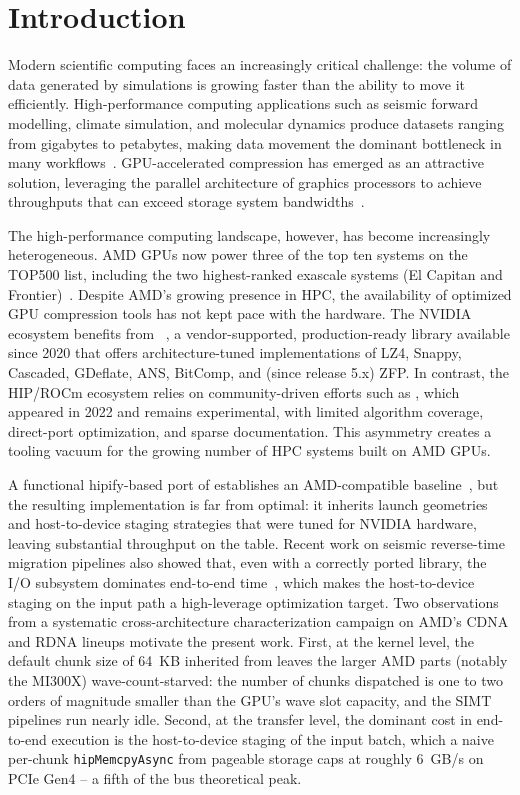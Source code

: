 \section{Introduction}
\label{sec:introduction}

Modern scientific computing faces an increasingly critical
challenge: the volume of data generated by simulations is growing
faster than the ability to move it efficiently. High-performance
computing applications such as seismic forward modelling, climate
simulation, and molecular dynamics produce datasets ranging from
gigabytes to petabytes, making data movement the dominant
bottleneck in many workflows~\cite{jin2024concealing,lee2002migration}.
GPU-accelerated compression has emerged as an attractive solution,
leveraging the parallel architecture of graphics processors to
achieve throughputs that can exceed storage system
bandwidths~\cite{nvcomp,knorr2021ndzip}.

The high-performance computing landscape, however, has become
increasingly heterogeneous. AMD GPUs now power three of the top ten
systems on the TOP500 list, including the two highest-ranked
exascale systems (El Capitan and Frontier)~\cite{top500nov2025}.
Despite AMD's growing presence in HPC, the availability of optimized
GPU compression tools has not kept pace with the hardware. The
NVIDIA ecosystem benefits from \nvcomp~\cite{nvcomp}, a
vendor-supported, production-ready library available since 2020
that offers architecture-tuned implementations of LZ4, Snappy,
Cascaded, GDeflate, ANS, BitComp, and (since release 5.x) ZFP. In
contrast, the HIP/ROCm ecosystem relies on community-driven efforts
such as \hipcomp{}, which appeared in 2022 and remains experimental,
with limited algorithm coverage, direct-port optimization, and
sparse documentation. This asymmetry creates a tooling vacuum for
the growing number of HPC systems built on AMD GPUs.

A functional hipify-based port of \nvcomp{} establishes an
AMD-compatible baseline~\cite{anon_iccsa2026,kunas2025compressao},
but the resulting implementation is far from optimal: it inherits
launch geometries and host-to-device staging strategies that were
tuned for NVIDIA hardware, leaving substantial throughput on the
table. Recent work on seismic reverse-time migration pipelines
also showed that, even with a correctly ported library, the I/O
subsystem dominates end-to-end time~\cite{kunas2024carla,
boito2017seismic}, which makes the host-to-device staging on the
input path a high-leverage optimization target. Two observations
from a systematic cross-architecture characterization campaign on
AMD's CDNA and RDNA lineups motivate the present work. First, at the kernel level, the default chunk size of 64~KB
inherited from \nvcomp{} leaves the larger AMD parts (notably the
MI300X) wave-count-starved: the number of chunks dispatched is one
to two orders of magnitude smaller than the GPU's wave slot
capacity, and the SIMT pipelines run nearly idle. Second, at the
transfer level, the dominant cost in end-to-end execution is the
host-to-device staging of the input batch, which a naive
per-chunk \texttt{hipMemcpyAsync} from pageable storage caps at
roughly 6~GB/s on PCIe Gen4 -- a fifth of the bus theoretical
peak.

